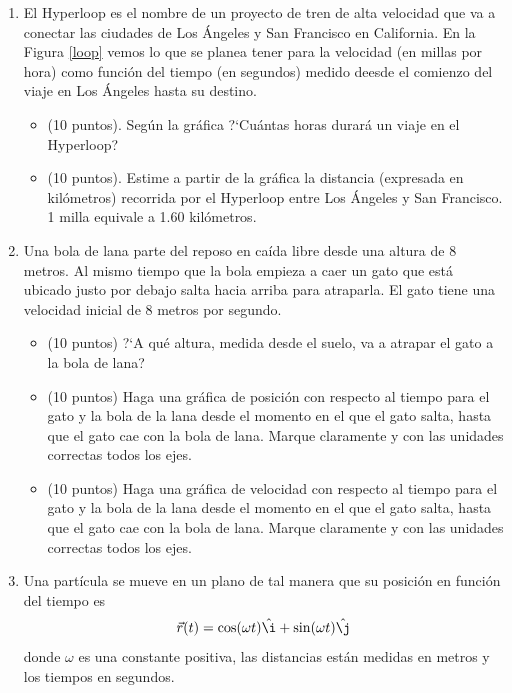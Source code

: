 \documentclass[letterpaper,10pt,onecolumn]{article}
\begin{document}
\begin{enumerate}

\item El Hyperloop es el nombre de un proyecto de tren de alta
  velocidad que va a conectar las ciudades de Los \'Angeles y San
  Francisco en California. En la Figura \ref{loop} vemos lo que se planea tener
  para la velocidad (en millas por hora) como funci\'on del tiempo (en
  segundos) medido deesde el comienzo del viaje en Los \'Angeles hasta
  su destino. 
\begin{itemize}
\item (10 puntos). Seg\'un la gr\'afica ?`Cu\'antas horas durar\'a un
  viaje en el Hyperloop? 
\item (10 puntos). Estime a partir de la gr\'afica la distancia (expresada en
  kil\'ometros) recorrida por el Hyperloop entre Los \'Angeles y San
  Francisco.  1 milla equivale a 1.60 kil\'ometros.
\end{itemize}


\item Una bola de lana parte del reposo en ca\'ida libre desde una
  altura de $8$ metros. Al mismo tiempo que la bola empieza a caer un
  gato que est\'a ubicado justo por debajo salta  hacia arriba para
  atraparla. El gato tiene una velocidad inicial de $8$ metros por segundo. 
\begin{itemize}
\item  (10 puntos) ?`A qu\'e altura, medida desde el suelo, va a atrapar el gato a la bola de lana?
\item  (10 puntos) Haga una gr\'afica de posici\'on con respecto al tiempo
  para el gato y la bola de la lana desde el momento en el que el gato
  salta, hasta que el gato cae con la bola de lana. Marque claramente
  y con las unidades correctas todos los ejes. 
\item  (10 puntos) Haga una gr\'afica de velocidad con respecto al tiempo
  para el gato y la bola de la lana desde el momento en el que el gato
  salta, hasta que el gato cae con la bola de lana. Marque claramente
  y con las unidades correctas todos los ejes. 
\end{itemize}


\item Una part\'icula se mueve en un plano de tal manera que su
  posici\'on en funci\'on del tiempo es 
\begin{displaymath}
\vec{r}(t)= \cos(\omega t)\hat {\i} +
  \sin(\omega t)\hat {\j}
\end{displaymath}
donde $\omega$ es una constante positiva, las distancias est\'an
medidas en metros y los tiempos en segundos. 


\end{enumerate}
\end{document}

